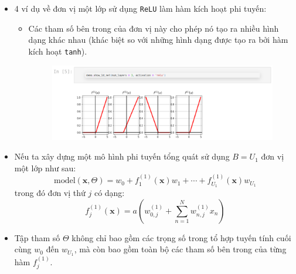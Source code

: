 \documentclass{book}
\begin{document}
    \begin{itemize}
        \item 4 ví dụ về đơn vị một lớp sử dụng \texttt{ReLU} làm hàm kích hoạt phi tuyến:
        \begin{itemize}
            \item Các tham số bên trong của đơn vị này cho phép nó tạo ra nhiều hình dạng khác nhau (khác biệt so với những hình dạng được tạo ra bởi hàm kích hoạt \texttt{tanh}).
            \begin{figure}[H]
                \centering
                \includegraphics[width=1.0\linewidth]{images/code19.png}
                \label{fig:code19}
            \end{figure}
        \end{itemize}    
    \end{itemize}
    \begin{itemize}
        \item Nếu ta xây dựng một mô hình phi tuyến tổng quát sử dụng $B = U_1$ đơn vị một lớp như sau:
        \[
        \text{model}(\textbf{x}, \Theta) = w_0 + f^{(1)}_1(\textbf{x}) w_1 + \cdots + f^{(1)}_{U_1}(\textbf{x}) w_{U_1}
        \]
        trong đó đơn vị thứ $j$ có dạng:
        \[
        f^{(1)}_j(\textbf{x}) = a\left(w^{(1)}_{0,j} + \sum_{n=1}^{N} w^{(1)}_{n,j} x_n \right)
        \]
        \item Tập tham số $\Theta$ không chỉ bao gồm các trọng số trong tổ hợp tuyến tính cuối cùng $w_0$ đến $w_{U_1}$, mà còn bao gồm toàn bộ các tham số bên trong của từng hàm $f^{(1)}_j$.

    \end{itemize}
\end{document}
